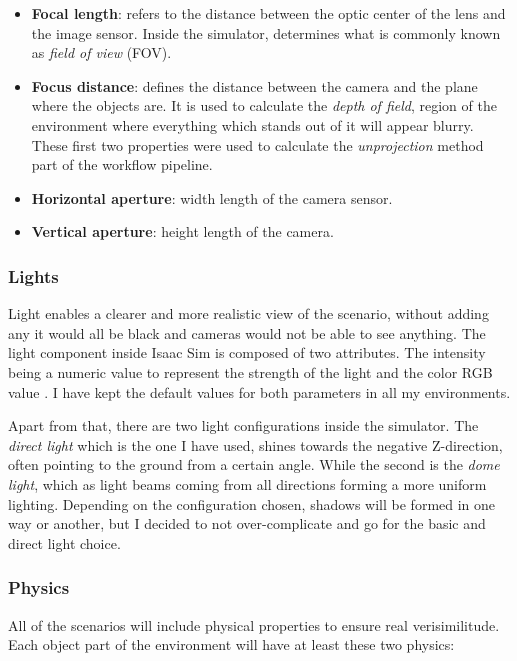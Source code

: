 \begin{itemize}
	\item \textbf{Focal length}: refers to the distance between the optic center of the lens and the image sensor. Inside the simulator, determines what is commonly known as \textit{field of view} (FOV).
	
	\item \textbf{Focus distance}: defines the distance between the camera and the plane where the objects are. It is used to calculate the \textit{depth of field}, region of the environment where everything which stands out of it will appear blurry. These first two properties were used to calculate the \textit{unprojection} method part of the workflow pipeline. 
	
	\item \textbf{Horizontal aperture}: width length of the camera sensor. 
	
	\item \textbf{Vertical aperture}: height length of the camera. 	
\end{itemize}

\subsubsection{Lights}
Light enables a clearer and more realistic view of the scenario, without adding any it would all be black and cameras would not be able to see anything. The light component inside Isaac Sim is composed of two attributes. The intensity being a numeric value to represent the strength of the light and the color RGB value \cite{SimLights}. I have kept the default values for both parameters in all my environments. 

Apart from that, there are two light configurations inside the simulator. The \textit{direct light} which is the one I have used, shines towards the negative Z-direction, often pointing to the ground from a certain angle. While the second is the \textit{dome light}, which as light beams coming from all directions forming a more uniform lighting. Depending on the configuration chosen, shadows will be formed in one way or another, but I decided to not over-complicate and go for the basic and direct light choice.

\subsubsection{Physics}
All of the scenarios will include physical properties to ensure real verisimilitude. Each object part of the environment will have at least these two physics:

